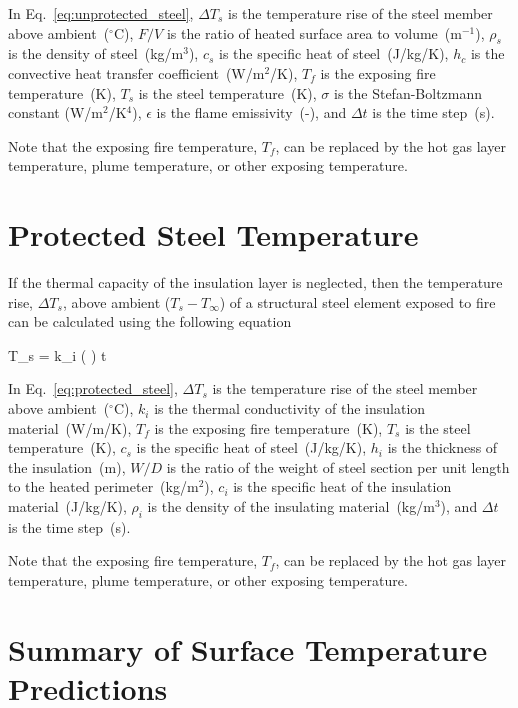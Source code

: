 In Eq.~\ref{eq:unprotected_steel}, $\Delta T_s$ is the temperature rise of the steel member above ambient~($^\circ$C), $F/V$ is the ratio of heated surface area to volume~(m$^{-1}$), $\rho_s$ is the density of steel~(kg/m$^3$), $c_s$ is the specific heat of steel~(J/kg/K), $h_c$ is the convective heat transfer coefficient~(W/m$^2$/K), $T_f$ is the exposing fire temperature~(K), $T_s$ is the steel temperature~(K), $\sigma$ is the Stefan-Boltzmann constant (W/m$^2$/K$^4$), $\epsilon$ is the flame emissivity~(-), and $\Delta t$ is the time step~(s).

Note that the exposing fire temperature, $T_f$, can be replaced by the hot gas layer temperature, plume temperature, or other exposing temperature.


\clearpage


\section{Protected Steel Temperature}
\label{info:protected_steel_temperature}

If the thermal capacity of the insulation layer is neglected, then the temperature rise, $\Delta T_s$, above ambient ($T_s - T_\infty$) of a structural steel element exposed to fire can be calculated using the following equation

\be
\Delta T_s = k_i \left(  \right) \Delta t
\label{eq:protected_steel}
\ee

In Eq.~\ref{eq:protected_steel}, $\Delta T_s$ is the temperature rise of the steel member above ambient~($^\circ$C), $k_i$ is the thermal conductivity of the insulation material~(W/m/K), $T_f$ is the exposing fire temperature~(K), $T_s$ is the steel temperature~(K), $c_s$ is the specific heat of steel~(J/kg/K), $h_i$ is the thickness of the insulation~(m), $W/D$ is the ratio of the weight of steel section per unit length to the heated perimeter~(kg/m$^2$), $c_i$ is the specific heat of the insulation material~(J/kg/K), $\rho_i$ is the density of the insulating material~(kg/m$^3$), and $\Delta t$ is the time step~(s).

Note that the exposing fire temperature, $T_f$, can be replaced by the hot gas layer temperature, plume temperature, or other exposing temperature.

\clearpage

\section{Summary of Surface Temperature Predictions}

